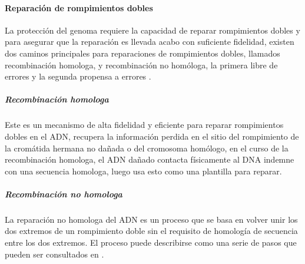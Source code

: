 \paragraph{Reparación de rompimientos dobles}

La protección del genoma requiere la capacidad de reparar rompimientos dobles y para asegurar que la reparación es llevada acabo con suficiente fidelidad, existen dos caminos principales para reparaciones de rompimientos dobles, llamados recombinación homologa, y recombinación no homóloga, la primera libre de errores y la segunda propensa a errores \cite{rescells}.

\subparagraph{Recombinación homologa}
Este es un mecanismo de alta fidelidad y eficiente para reparar rompimientos dobles en el ADN, recupera la información perdida en el sitio del rompimiento de la cromátida hermana no dañada o del cromosoma homólogo, en el curso de la recombinación homologa, el ADN dañado contacta físicamente al DNA indemne con una secuencia homologa, luego usa esto como una plantilla para reparar\cite{rescells}.

\subparagraph{Recombinación no homologa}

La reparación no homologa del ADN  es un proceso que se basa en volver unir los dos extremos de un rompimiento doble sin el requisito de homología de secuencia entre los dos extremos. El proceso puede describirse como una serie de pasos que pueden ser consultados en \cite{rescells}.




